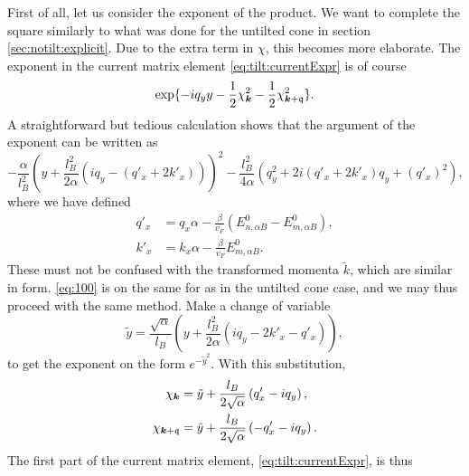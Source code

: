 First of all, let us consider the exponent of the product.
We want to complete the square similarly to what was done for the untilted cone in section \ref{sec:notilt:explicit}.
Due to the extra term in \(\chi\), this becomes more elaborate.
The exponent in the current matrix element \cref{eq:tilt:currentExpr} is of course
\begin{equation}
  \label{eq:99}
  \exp\{-i q_{y} y - \frac{1}{2} \chi_{\bm{k}} ^2 - \frac{1}{2} \chi _{\bm{k} + \mathfrak{q}}^2\}.
\end{equation}
A straightforward but tedious calculation shows that the argument of the exponent can be written as
\begin{equation}
  \label{eq:100}
  -\frac{\alpha}{l_{B}^2} \left(y + \frac{l_{B}^2}{2 \alpha } (i q_{y} - (q'_x + 2 k'_x))\right)^2
  -\frac{l_{B}^2}{4 \alpha } (q_{y}^2 + 2i (q'_x + 2 k'_x) q_{y} + ( q' _{x} )^2 ),
\end{equation}
where we have defined
\begin{align}
  \label{eq:qkprime}
  q' _x &= q_x \alpha  - \frac{\beta}{v_{F} }( E^0_{n,\alpha B} - E^0_{m, \alpha B} ),\\
  k' _x &= k_x\alpha - \frac{\beta}{v_F } E^0_{m, \alpha B}.
\end{align}
These must not be confused with the transformed momenta \( \tilde{k} \), which are similar in form.
\cref{eq:100} is on the same for as in the untilted cone case, and we may thus proceed with the same method.
Make a change of variable
\[
\tilde{y} = \frac{\sqrt{\alpha }}{l_{B}} \left(y + \frac{l_{B}^2}{2\alpha } (iq_{y} - 2 k' _x - q' _x )\right),
\]
to get the exponent on the form \(e^{-\tilde{y}^2}\).
With this substitution,
\begin{align}
  \chi _{\bm{k}} &= \tilde{y} + \frac{l_{B}}{2 \sqrt{\alpha }} \left(q' _x - i q_{y}\right),\\
  \chi _{\bm{k} + \mathfrak{q}} &= \tilde{y} + \frac{l_{B}}{2 \sqrt{\alpha }} \left(- q' _x - i q_{y}\right).
\end{align}
The first part of the current matrix element, \cref{eq:tilt:currentExpr}, is thus
